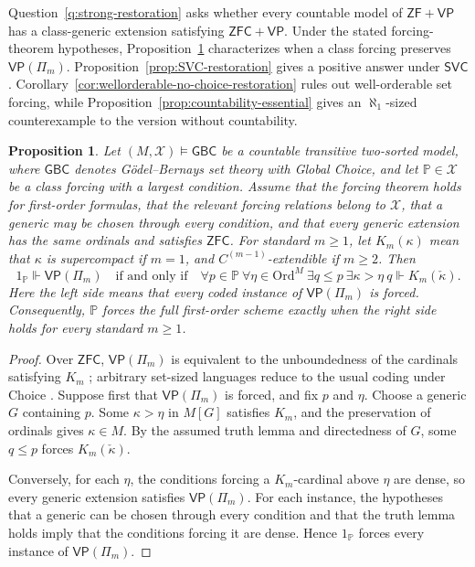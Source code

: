 \documentclass[11pt,a4paper]{amsart}
\newcommand{\VP}{\mathsf{VP}}
\newcommand{\ZF}{\mathsf{ZF}}
\newcommand{\ZFC}{\mathsf{ZFC}}
\newcommand{\GBC}{\mathsf{GBC}}
\newcommand{\Ord}{\mathrm{Ord}}
\theoremstyle{plain}
\newtheorem{proposition}[theorem]{Proposition}
\theoremstyle{definition}
\theoremstyle{remark}
\begin{document}
Question~\ref{q:strong-restoration} asks whether every countable model of $\ZF+\VP$ has a class-generic extension satisfying $\ZFC+\VP$.  Under the stated forcing-theorem hypotheses, Proposition~\ref{prop:class-forcing-criteria} characterizes when a class forcing preserves $\VP(\Pi_m)$.  Proposition~\ref{prop:SVC-restoration} gives a positive answer under $\mathsf{SVC}$.  Corollary~\ref{cor:wellorderable-no-choice-restoration} rules out well-orderable set forcing, while Proposition~\ref{prop:countability-essential} gives an $\aleph_1$-sized counterexample to the version without countability.

\begingroup

\begin{proposition}\label{prop:class-forcing-criteria}
Let $(M,\mathcal X)\models\GBC$ be a countable transitive two-sorted model, {where $\GBC$ denotes G\"odel--Bernays set theory with Global Choice}, and let $\mathbb P\in\mathcal X$ be a class forcing with a largest condition.  Assume that the forcing theorem holds for first-order formulas, that the relevant forcing relations belong to $\mathcal X$, that a generic may be chosen through every condition, and that every generic extension has the same ordinals and satisfies $\ZFC$.  For standard $m\geq1$, let $K_m(\kappa)$ mean that $\kappa$ is supercompact if $m=1$, and $C^{(m-1)}$-extendible if $m\geq2$.  Then
\[
1_{\mathbb P}\Vdash\VP(\Pi_m)\quad\text{if and only if}\quad
\forall p\in\mathbb P\ \forall\eta\in\Ord^M\ 
\exists q\leq p\ \exists\kappa>\eta\ 
q\Vdash K_m(\check\kappa).
\]
Here the left side means that every coded instance of $\VP(\Pi_m)$ is forced.  Consequently, $\mathbb P$ forces the full first-order scheme exactly when the right side holds for every standard $m\geq1$.
\end{proposition}

\begin{proof}
Over $\ZFC$, $\VP(\Pi_m)$ is equivalent to the unboundedness of the cardinals satisfying $K_m$ \cite[Theorem~4.3(2), Corollary~4.7, Theorem~4.11, and the paragraph following Theorem~4.12]{BagariaCn}; arbitrary set-sized languages reduce to the usual coding under Choice \cite[Lemma~23]{BrookeTaylor}.  Suppose first that $\VP(\Pi_m)$ is forced, and fix $p$ and $\eta$.  Choose a generic $G$ containing $p$.  Some $\kappa>\eta$ in $M[G]$ satisfies $K_m$, and the preservation of ordinals gives $\kappa\in M$.  By the assumed truth lemma and directedness of $G$, some $q\leq p$ forces $K_m(\check\kappa)$.

Conversely, for each $\eta$, the conditions forcing a $K_m$-cardinal above $\eta$ are dense, so every generic extension satisfies $\VP(\Pi_m)$.  For each instance, the hypotheses that a generic can be chosen through every condition and that the truth lemma holds imply that the conditions forcing it are dense.  Hence $1_{\mathbb P}$ forces every instance of $\VP(\Pi_m)$.
\end{proof}
\endgroup
\end{document}
